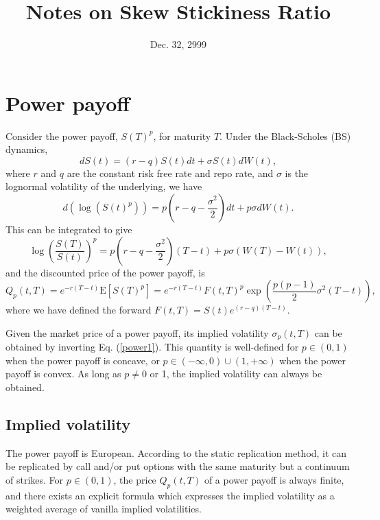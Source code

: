 \documentclass[12pt]{article}
\begin{document}
\title{Notes on Skew Stickiness Ratio}
\date{Dec. 32, 2999}

\maketitle

\section{Power payoff}

  Consider the power payoff, $S(T)^p$, for maturity $T$. Under the Black-Scholes (BS) dynamics,
  \begin{equation}
    dS(t) = (r-q)S(t)dt+\sigma S(t)dW(t),
  \end{equation}
  where $r$ and $q$ are the constant risk free rate and repo rate, and $\sigma$ is the lognormal volatility of the
  underlying, we have
  \begin{equation}
    d\left(\log\left(S(t)^p\right)\right) = p\left(r-q-\frac{\sigma ^2}{2}\right)dt + p\sigma dW(t).
  \end{equation}
  This can be integrated to give
  \begin{equation}
    \log\left(\frac{S(T)}{S(t)}\right)^p = p\left(r-q-\frac{\sigma ^2}{2}\right)(T-t) + p\sigma\left(W(T)-W(t)\right),
  \end{equation}
  and the discounted price of the power payoff, is
  \begin{equation}
    Q_p(t,T)=e^{-r(T-t)}{\mathrm E}\left[S(T)^p\right]=e^{-r(T-t)}F(t,T)^p\exp\left(\frac{p(p-1)}{2}\sigma^2(T-t)\right),
    \label{power1}
  \end{equation}
  where we have defined the forward $F(t,T)=S(t)e^{(r-q)(T-t)}$.

  Given the market price of a power payoff, its implied volatility $\sigma_p(t,T)$ can be obtained by inverting
  Eq. (\ref{power1}). This quantity is well-defined for $p\in (0,1)$ when the power payoff is concave, or
  $p\in (-\infty, 0)\cup (1,+\infty)$ when the power payoff is convex. As long as $p\neq 0$ or 1, the implied volatility
  can always be obtained.

  \subsection{Implied volatility}

    The power payoff is European. According to the static replication method, it can be replicated by call and/or
    put options with the same maturity but a continuum of strikes. For $p\in (0,1)$, the price $Q_p(t,T)$ of a power payoff
    is always finite, and there exists an explicit formula which expresses the implied volatility as a weighted average of
    vanilla implied volatilities.
\end{document}
